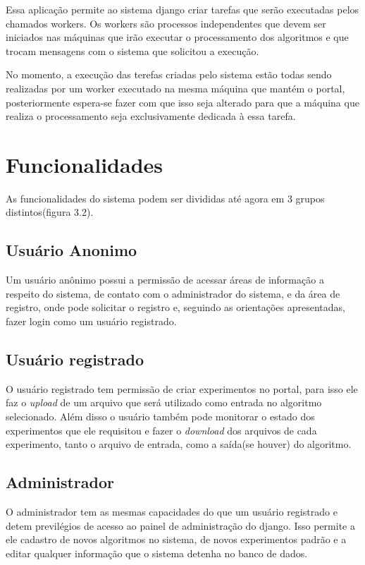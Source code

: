 \documentclass[tg]{mdtufsm}
\begin{document}
Essa aplicação permite ao sistema django criar tarefas que serão executadas pelos chamados workers. Os workers são processos independentes que devem ser iniciados nas máquinas que irão executar o processamento dos algoritmos e que trocam mensagens com o sistema que solicitou a execução.

No momento, a execução das terefas criadas pelo sistema estão todas sendo realizadas por um worker executado na mesma máquina que mantém o portal, posteriormente espera-se fazer com que isso seja alterado para que a máquina que realiza o processamento seja exclusivamente dedicada à essa tarefa.

\section{Funcionalidades}
As funcionalidades do sistema podem ser divididas até agora em 3 grupos distintos(figura 3.2).
\subsection{Usuário Anonimo}
Um usuário anônimo possui a permissão de acessar áreas de informação a respeito do sistema, de contato com o administrador do sistema, e da área de registro, onde pode solicitar o registro e, seguindo as orientações apresentadas, fazer login como um usuário registrado.
\subsection{Usuário registrado}
O usuário registrado tem permissão de criar experimentos no portal, para isso ele faz o \emph{upload} de um arquivo que será utilizado como entrada no algoritmo selecionado. Além disso o usuário também pode monitorar o estado dos experimentos que ele requisitou e fazer o \emph{download} dos arquivos de cada experimento, tanto o arquivo de entrada, como a saída(se houver) do algoritmo.
\subsection{Administrador}
O administrador tem as mesmas capacidades do que um usuário registrado e detem previlégios de acesso ao painel de administração do django. Isso permite a ele cadastro de novos algoritmos no sistema, de novos experimentos padrão e a editar qualquer informação que o sistema detenha no banco de dados.
\end{document}
